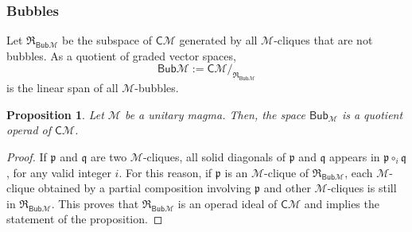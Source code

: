 \documentclass[10pt,reqno]{amsart}
\numberwithin{equation}{subsection}
\newtheorem{Proposition}[Theorem]{Proposition}
\newcommand{\Mca}{\mathcal{M}}
\newcommand{\Pfr}{\mathfrak{p}}
\newcommand{\Qfr}{\mathfrak{q}}
\newcommand{\Cli}{\mathsf{C}}
\newcommand{\Bub}{\mathsf{Bub}}
\newcommand{\Rel}{\mathfrak{R}}
\begin{document}
\subsubsection{Bubbles}
\label{subsubsec:quotient_Cli_M_bubbles}
Let $\Rel_{\Bub\Mca}$ be the subspace of $\Cli\Mca$ generated by all
$\Mca$-cliques that are not bubbles. As a quotient of graded vector
spaces,
\begin{equation}
    \Bub\Mca := \Cli\Mca/_{\Rel_{\Bub\Mca}}
\end{equation}
is the linear span of all $\Mca$-bubbles.
\medskip

\begin{Proposition} \label{prop:quotient_Cli_M_bubbles}
    Let $\Mca$ be a unitary magma. Then, the space $\Bub_\Mca$ is a
    quotient operad of $\Cli\Mca$.
\end{Proposition}
\begin{proof}
    If $\Pfr$ and $\Qfr$ are two $\Mca$-cliques, all solid diagonals
    of $\Pfr$ and $\Qfr$ appears in $\Pfr \circ_i \Qfr$, for any valid
    integer $i$. For this reason, if $\Pfr$ is an $\Mca$-clique of
    $\Rel_{\Bub\Mca}$, each $\Mca$-clique obtained by a partial
    composition involving $\Pfr$ and other $\Mca$-cliques is still in
    $\Rel_{\Bub\Mca}$. This proves that $\Rel_{\Bub\Mca}$ is an operad
    ideal of $\Cli\Mca$ and implies the statement of the proposition.
\end{proof}
\medskip
\end{document}

